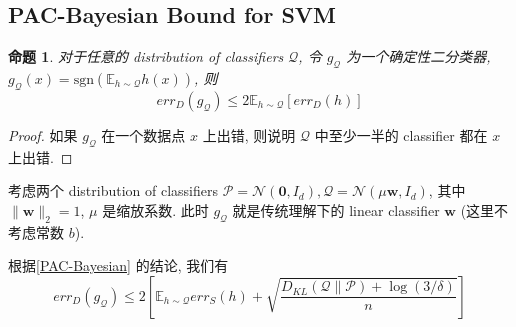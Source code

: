\documentclass[8pt]{article}
\theoremstyle{compact}
\newtheorem{proposition}[theorem]{命题}
\def\le{\leqslant}
\begin{document}
\subsection{PAC-Bayesian Bound for SVM}
\begin{proposition}
	对于任意的 distribution of classifiers $\mathcal Q$, 令 $g_{\mathcal Q}$ 为一个确定性二分类器, $g_{\mathcal Q}(x) = \text{sgn}(\mathbb E_{h \sim \mathcal Q}h(x))$, 则 $$err_D(g_{\mathcal Q}) \le 2\mathbb E_{h \sim \mathcal Q}[err_D(h)]$$
\end{proposition}
\begin{proof}
	如果 $g_{\mathcal Q}$ 在一个数据点 $x$ 上出错, 则说明 $\mathcal Q$ 中至少一半的 classifier 都在 $x$ 上出错.
\end{proof}

考虑两个 distribution of classifiers $\mathcal P = \mathcal N(\mathbf 0, I_d), \mathcal Q = \mathcal N(\mu\mathbf w, I_d)$, 其中 $\|\mathbf w\|_2 = 1$, $\mu$ 是缩放系数. 此时 $g_{\mathcal Q}$ 就是传统理解下的 linear classifier $\mathbf w$ (这里不考虑常数 $b$).

根据\cref{PAC-Bayesian} 的结论, 我们有 $$err_D(g_{\mathcal Q}) \le 2 \left[\mathbb E_{h \sim \mathcal Q}err_S(h) + \sqrt{\frac{D_{KL}(\mathcal Q \| \mathcal P) + \log(3 / \delta)}{n}}\right]$$
\end{document}
